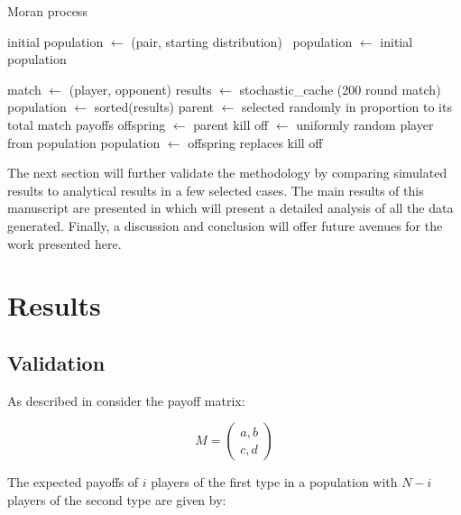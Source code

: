 \documentclass[10pt,letterpaper]{article}
\begin{document}
\begin{algorithm}[!hbtp]
        \caption{Moran process}
        \label{alg:moran_process}
          \begin{algorithmic}[1]
          \STATE initial population $\gets$ (pair, starting distribution) \
          \STATE population $\gets$ initial population

                \STATE match $\gets$ (player, opponent) 
                \STATE results $\gets$ stochastic\_cache (200 round match)
                \ENDFOR
              \ENDFOR
              \STATE population $\gets$ sorted(results)
              \STATE parent $\gets$ selected randomly in proportion to its total match payoffs
              \STATE offspring $\gets$ parent
              \STATE kill off $\gets$ uniformly random player from population
              \STATE population $\gets$ offspring replaces kill off
            \ENDWHILE
          \end{algorithmic}
\end{algorithm}

The next section will further validate the methodology by comparing
simulated results to analytical results in a few selected cases. The main
results of this
manuscript are presented in which will
present a detailed analysis of all the data generated. Finally,
a discussion and conclusion will offer future avenues for the work
presented here.

\section*{Results}

\subsection*{Validation}

As described in \cite{Nowak} consider the payoff matrix:

\begin{equation}\label{equ:payoff_matrix}
    M = \begin{pmatrix}
        a, b\\
        c, d
        \end{pmatrix}
\end{equation}

The expected payoffs of \(i\) players of the first type in a population with \(N
- i\) players of the second type are given by:
\end{document}

